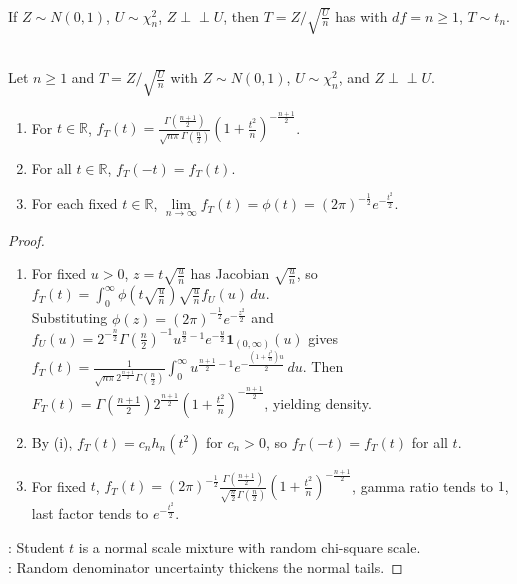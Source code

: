 \begin{definition} \label{def:student-t-distribution} \\
If $Z\sim N(0,1)$, $U\sim\chi_n^2$, $Z\perp\!\!\!\perp U$, then $T=Z/\sqrt{\frac{U}{n}}$ has  with $df = n \geq 1$, $T\sim t_n$.
\end{definition}

\begin{proposition} \label{prop:student-t-density} \\
Let $n\geq1$ and $T=Z/\sqrt{\frac{U}{n}}$ with $Z\sim N(0,1)$, $U\sim\chi_n^2$, and $Z\perp\!\!\!\perp U$.
\begin{enumerate}[label=(\roman*)]
\setlength{\itemsep}{0pt}
\item For $t\in\mathbb{R}$, $f_T(t)=\frac{\Gamma(\frac{n+1}{2})}{\sqrt{n\pi}\Gamma(\frac{n}{2})}(1+\frac{t^2}{n})^{-\frac{n+1}{2}}$.
\item For all $t\in\mathbb{R}$, $f_T(-t)=f_T(t)$.
\item For each fixed $t\in\mathbb{R}$, $\lim\limits_{n\to\infty}f_T(t)=\phi(t)=(2\pi)^{-\frac{1}{2}}e^{-\frac{t^2}{2}}$.
\end{enumerate}
\begin{proof}
\begin{enumerate}[label=(\roman*)]
\setlength{\itemsep}{0pt}
\item For fixed $u>0$, $z=t\sqrt{\frac{u}{n}}$ has Jacobian $\sqrt{\frac{u}{n}}$, so $f_T(t)=\int_0^\infty\phi(t\sqrt{\frac{u}{n}})\sqrt{\frac{u}{n}}f_U(u)\,du$.\\
Substituting $\phi(z)=(2\pi)^{-\frac{1}{2}}e^{-\frac{z^2}{2}}$ and $f_U(u)=2^{-\frac{n}{2}}\Gamma(\frac{n}{2})^{-1}u^{\frac{n}{2}-1}e^{-\frac{u}{2}}\mathbf{1}_{(0,\infty)}(u)$ gives\\
$f_T(t)=\frac{1}{\sqrt{n\pi}2^{\frac{n+1}{2}}\Gamma(\frac{n}{2})}\int_0^\infty u^{\frac{n+1}{2}-1}e^{-\frac{(1+\frac{t^2}{n})u}{2}}\,du$. Then $F_T(t) = \Gamma(\frac{n+1}{2})2^{\frac{n+1}{2}}(1+\frac{t^2}{n})^{-\frac{n+1}{2}}$, yielding density.
\item By (i), $f_T(t)=c_nh_n(t^2)$ for $c_n>0$, so $f_T(-t)=f_T(t)$ for all $t$.
\item For fixed $t$, $f_T(t)=(2\pi)^{-\frac{1}{2}}\frac{\Gamma(\frac{n+1}{2})}{\sqrt{\frac{n}{2}}\Gamma(\frac{n}{2})}(1+\frac{t^2}{n})^{-\frac{n+1}{2}}$, gamma ratio tends to $1$, last factor tends to $e^{-\frac{t^2}{2}}$.
\end{enumerate}
: Student $t$ is a normal scale mixture with random chi-square scale.\\
: Random denominator uncertainty thickens the normal tails.
\end{proof}
\end{proposition}

